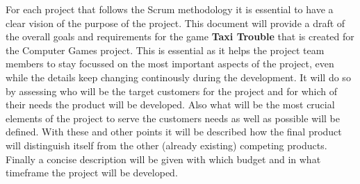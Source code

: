 For each project that follows the Scrum methodology it is essential to have a clear vision of the purpose of the project. This document will provide a draft of the overall goals and requirements for the game \textbf{Taxi Trouble} that is created for the Computer Games project. This is essential as it helps the project team members to stay focussed on the most important aspects of the project, even while the details keep changing continously during the development. It will do so by assessing who will be the target customers for the project and for which of their needs the product will be developed. Also what will be the most crucial elements of the project to serve the customers needs as well as possible will be defined. With these and other points it will be described how the final product will distinguish itself from the other (already existing) competing products. Finally a concise description will be given with which budget and in what timeframe the project will be developed.



